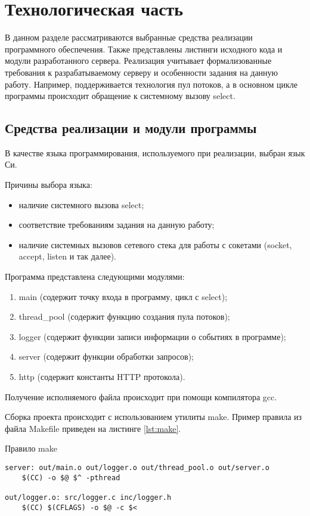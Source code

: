 \section{Технологическая часть}

В данном разделе рассматриваются выбранные средства реализации программного обеспечения.
Также представлены листинги исходного кода и модули разработанного сервера.
Реализация учитывает формализованные требования к разрабатываемому серверу и особенности задания на данную работу.
Например, поддерживается технология пул потоков, а в основном цикле программы происходит обращение к системному вызову select.

\subsection{Средства реализации и модули программы}

В качестве языка программирования, используемого при реализации, выбран язык Си.

Причины выбора языка:
\begin{itemize}
	\item наличие системного вызова select;
	\item соответствие требованиям задания на данную работу;
	\item наличие системных вызовов сетевого стека для работы с сокетами (socket, accept, listen и так далее).
\end{itemize}

Программа представлена следующими модулями:
\begin{enumerate}
	\item main (содержит точку входа в программу, цикл с select);
	\item thread\_pool (содержит функцию создания пула потоков);
	\item logger (содержит функции записи информации о событиях в программе);
	\item server (содержит функции обработки запросов);
	\item http (содержит константы HTTP протокола).
\end{enumerate}

Получение исполняемого файла происходит при помощи компилятора gcc.

Сборка проекта происходит с использованием утилиты make.
Пример правила из файла Makefile приведен на листинге \ref{lst:make}.

\begin{listing}[!h]
	\caption{Правило make}
	\label{lst:make}
	\begin{verbatim}
server: out/main.o out/logger.o out/thread_pool.o out/server.o
	$(CC) -o $@ $^ -pthread

out/logger.o: src/logger.c inc/logger.h
	$(CC) $(CFLAGS) -o $@ -c $<
	\end{verbatim}
\end{listing}

